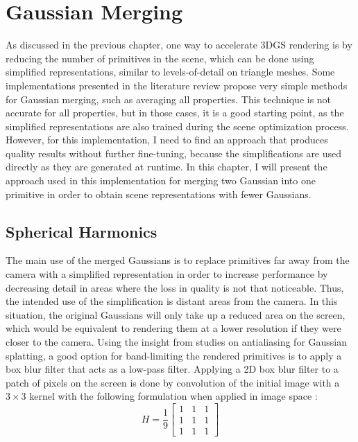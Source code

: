 \section{Gaussian Merging}
As discussed in the previous chapter, one way to accelerate 3DGS rendering is by reducing the number of primitives in the scene, which can be done using simplified representations, similar to levels-of-detail on triangle meshes. Some implementations presented in the literature review propose very simple methods for Gaussian merging, such as averaging all properties. This technique is not accurate for all properties, but in those cases, it is a good starting point, as the simplified representations are also trained during the scene optimization process. However, for this implementation, I need to find an approach that produces quality results without further fine-tuning, because the simplifications are used directly as they are generated at runtime. In this chapter, I will present the approach used in this implementation for merging two Gaussian into one primitive in order to obtain scene representations with fewer Gaussians.

\subsection{Spherical Harmonics}
The main use of the merged Gaussians is to replace primitives far away from the camera with a simplified representation in order to increase performance by decreasing detail in areas where the loss in quality is not that noticeable. Thus, the intended use of the simplification is distant areas from the camera. In this situation, the original Gaussians will only take up a reduced area on the screen, which would be equivalent to rendering them at a lower resolution if they were closer to the camera. Using the insight from studies on antialiasing for Gaussian splatting, a good option for band-limiting the rendered primitives is to apply a box blur filter that acts as a low-pass filter. Applying a 2D box blur filter to a patch of pixels on the screen is done by convolution of the initial image with a $3 \times 3$ kernel with the following formulation when applied in image space \cite{box_filter}: 
\[H = \frac{1}{9} \begin{bmatrix}
1 & 1 & 1\\
1 & 1 & 1\\
1 & 1 & 1
\end{bmatrix}\]

